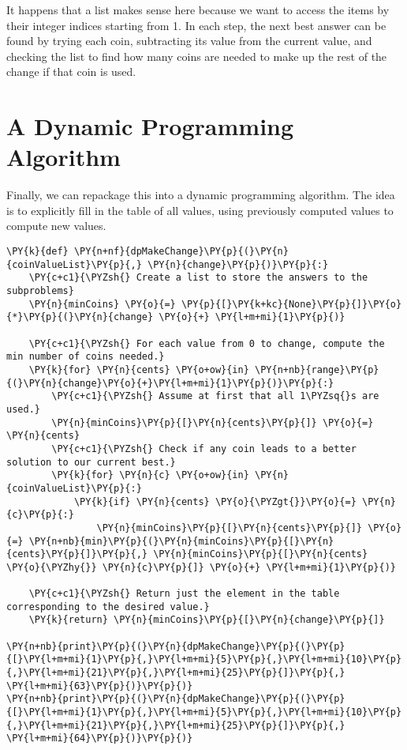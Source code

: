 It happens that a list makes sense here because we want to access the items by their integer indices starting from 1.
In each step, the next best answer can be found by trying each coin, subtracting its value from the current value, and checking the list to find how many coins are needed to make up the rest of the change if that coin is used.

\section{A Dynamic Programming Algorithm}


Finally, we can repackage this into a dynamic programming algorithm.
The idea is to explicitly fill in the table of all values, using previously computed values to compute new values.

\begin{Verbatim}[commandchars=\\\{\}]
\PY{k}{def} \PY{n+nf}{dpMakeChange}\PY{p}{(}\PY{n}{coinValueList}\PY{p}{,} \PY{n}{change}\PY{p}{)}\PY{p}{:}
    \PY{c+c1}{\PYZsh{} Create a list to store the answers to the subproblems}
    \PY{n}{minCoins} \PY{o}{=} \PY{p}{[}\PY{k+kc}{None}\PY{p}{]}\PY{o}{*}\PY{p}{(}\PY{n}{change} \PY{o}{+} \PY{l+m+mi}{1}\PY{p}{)}

    \PY{c+c1}{\PYZsh{} For each value from 0 to change, compute the min number of coins needed.}
    \PY{k}{for} \PY{n}{cents} \PY{o+ow}{in} \PY{n+nb}{range}\PY{p}{(}\PY{n}{change}\PY{o}{+}\PY{l+m+mi}{1}\PY{p}{)}\PY{p}{:}
        \PY{c+c1}{\PYZsh{} Assume at first that all 1\PYZsq{}s are used.}
        \PY{n}{minCoins}\PY{p}{[}\PY{n}{cents}\PY{p}{]} \PY{o}{=} \PY{n}{cents}
        \PY{c+c1}{\PYZsh{} Check if any coin leads to a better solution to our current best.}
        \PY{k}{for} \PY{n}{c} \PY{o+ow}{in} \PY{n}{coinValueList}\PY{p}{:}
            \PY{k}{if} \PY{n}{cents} \PY{o}{\PYZgt{}}\PY{o}{=} \PY{n}{c}\PY{p}{:}
                \PY{n}{minCoins}\PY{p}{[}\PY{n}{cents}\PY{p}{]} \PY{o}{=} \PY{n+nb}{min}\PY{p}{(}\PY{n}{minCoins}\PY{p}{[}\PY{n}{cents}\PY{p}{]}\PY{p}{,} \PY{n}{minCoins}\PY{p}{[}\PY{n}{cents} \PY{o}{\PYZhy{}} \PY{n}{c}\PY{p}{]} \PY{o}{+} \PY{l+m+mi}{1}\PY{p}{)}

    \PY{c+c1}{\PYZsh{} Return just the element in the table corresponding to the desired value.}
    \PY{k}{return} \PY{n}{minCoins}\PY{p}{[}\PY{n}{change}\PY{p}{]}

\PY{n+nb}{print}\PY{p}{(}\PY{n}{dpMakeChange}\PY{p}{(}\PY{p}{[}\PY{l+m+mi}{1}\PY{p}{,}\PY{l+m+mi}{5}\PY{p}{,}\PY{l+m+mi}{10}\PY{p}{,}\PY{l+m+mi}{21}\PY{p}{,}\PY{l+m+mi}{25}\PY{p}{]}\PY{p}{,} \PY{l+m+mi}{63}\PY{p}{)}\PY{p}{)}
\PY{n+nb}{print}\PY{p}{(}\PY{n}{dpMakeChange}\PY{p}{(}\PY{p}{[}\PY{l+m+mi}{1}\PY{p}{,}\PY{l+m+mi}{5}\PY{p}{,}\PY{l+m+mi}{10}\PY{p}{,}\PY{l+m+mi}{21}\PY{p}{,}\PY{l+m+mi}{25}\PY{p}{]}\PY{p}{,} \PY{l+m+mi}{64}\PY{p}{)}\PY{p}{)}
\end{Verbatim}



